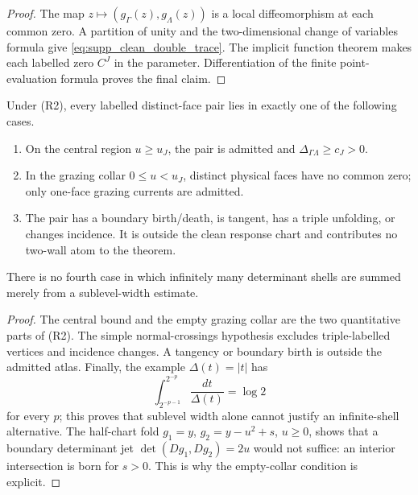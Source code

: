 \begin{proof}
The map \(z\mapsto(g_\Gamma(z),g_\Lambda(z))\) is a local diffeomorphism at
each common zero.  A partition of unity and the two-dimensional change of
variables formula give \eqref{eq:supp_clean_double_trace}.  The implicit
function theorem makes each labelled zero \(C^J\) in the parameter.
Differentiation of the finite point-evaluation formula proves the final
claim.
\end{proof}

\begin{proposition}
\label{prop:supp_normal_determinant_lower_bound_cases}
Under (R2), every labelled distinct-face pair lies in exactly one of the
following cases.
\begin{enumerate}[label=\textup{(\roman*)},wide,labelindent=0pt]
  \item On the central region \(u\ge u_J\), the pair is admitted and
  \(\Delta_{\Gamma\Lambda}\ge c_J>0\).
  \item In the grazing collar \(0\le u<u_J\), distinct physical faces have no
  common zero; only one-face grazing currents are admitted.
  \item The pair has a boundary birth/death, is tangent, has a triple
  unfolding, or changes incidence.
  It is outside the clean response chart and contributes no two-wall atom to
  the theorem.
\end{enumerate}
There is no fourth case in which infinitely many determinant shells are
summed merely from a sublevel-width estimate.
\end{proposition}

\begin{proof}
The central bound and the empty grazing collar are the two quantitative parts
of (R2).  The simple normal-crossings hypothesis excludes triple-labelled
vertices and incidence changes.  A tangency or boundary birth is outside the
admitted atlas.  Finally, the example \(\Delta(t)=|t|\) has
\[
  \int_{2^{-p-1}}^{2^{-p}}\frac{dt}{\Delta(t)}=\log2
\]
for every \(p\); this proves that sublevel width alone cannot justify an
infinite-shell alternative.
The half-chart fold
\(g_1=y\), \(g_2=y-u^2+s\), \(u\ge0\), shows that a boundary determinant jet
\(\det(Dg_1,Dg_2)=2u\) would not suffice: an interior intersection is born for
\(s>0\).  This is why the empty-collar condition is explicit.
\end{proof}

